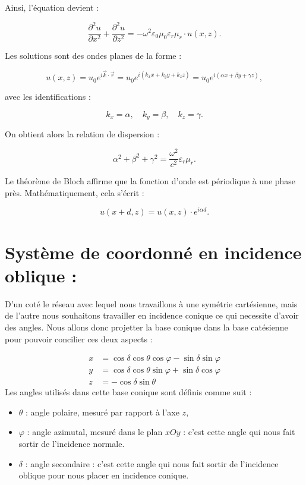 \documentclass{article}
\begin{document}
Ainsi, l'équation devient :

\[
\frac{\partial^2 u}{\partial x^2} + \frac{\partial^2 u}{\partial z^2} = -\omega^2 \varepsilon_0 \mu_0 \varepsilon_r \mu_r \cdot u(x, z).
\]

Les solutions sont des ondes planes de la forme :

\[
u(x, z) = u_0 e^{i \vec{k} \cdot \vec{r}} = u_0 e^{i(k_x x + k_y y + k_z z)} = u_0 e^{i(\alpha x + \beta y + \gamma z)},
\]

avec les identifications :

\[
k_x = \alpha, \quad k_y = \beta, \quad k_z = \gamma.
\]

On obtient alors la relation de dispersion :

\[
\alpha^2 + \beta^2 + \gamma^2 = \frac{\omega^2}{c^2} \varepsilon_r \mu_r.
\]

Le théorème de Bloch affirme que la fonction d'onde est périodique à une phase près. Mathématiquement, cela s’écrit :

\[
u(x + d, z) = u(x, z) \cdot e^{i \alpha d}.
\]

\section*{Système de coordonné en incidence oblique :}

D'un coté le réseau avec lequel nous travaillons à une symétrie cartésienne, mais de l'autre nous souhaitons travailler en incidence conique ce qui necessite d'avoir des angles. Nous allons donc projetter la base conique dans la base catésienne pour pouvoir concilier ces deux aspects : 

\begin{align*}
x &= \cos\delta \cos\theta \cos\varphi - \sin\delta \sin\varphi \\
y &= \cos\delta \cos\theta \sin\varphi + \sin\delta \cos\varphi \\
z &= -\cos\delta \sin\theta
\end{align*}
\noindent
Les angles utilisés dans cette base conique sont définis comme suit :
\begin{itemize}
  \item \( \theta \) : angle polaire, mesuré par rapport à l’axe \( z \),
  \item \( \varphi \) : angle azimutal, mesuré dans le plan \( xOy \) : c'est cette angle qui nous fait sortir de l'incidence normale.
  \item \( \delta \) : angle secondaire : c'est cette angle qui nous fait sortir de l'incidence oblique pour nous placer en incidence conique.
\end{itemize}
\end{document}
